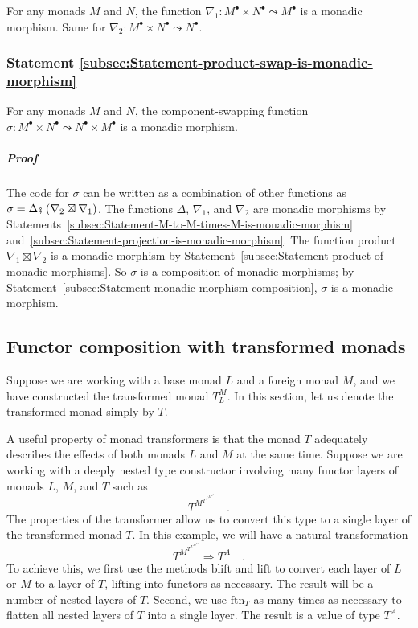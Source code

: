 For any monads $M$ and $N$, the function $\nabla_{1}:M^{\bullet}\times N^{\bullet}\leadsto M^{\bullet}$
is a monadic morphism. Same for $\nabla_{2}:M^{\bullet}\times N^{\bullet}\leadsto N^{\bullet}$.

\subsubsection{Statement \label{subsec:Statement-product-swap-is-monadic-morphism}\ref{subsec:Statement-product-swap-is-monadic-morphism}}

For any monads $M$ and $N$, the component-swapping function $\sigma:M^{\bullet}\times N^{\bullet}\leadsto N^{\bullet}\times M^{\bullet}$
is a monadic morphism.

\subparagraph{Proof}

The code for $\sigma$ can be written as a combination of other functions
as $\sigma=\Delta\bef\left(\nabla_{2}\boxtimes\nabla_{1}\right)$.
The functions $\Delta$, $\nabla_{1}$, and $\nabla_{2}$ are monadic
morphisms by Statements~\ref{subsec:Statement-M-to-M-times-M-is-monadic-morphism}
and~\ref{subsec:Statement-projection-is-monadic-morphism}. The function
product $\nabla_{1}\boxtimes\nabla_{2}$ is a monadic morphism by
Statement~\ref{subsec:Statement-product-of-monadic-morphisms}. So
$\sigma$ is a composition of monadic morphisms; by Statement~\ref{subsec:Statement-monadic-morphism-composition},
$\sigma$ is a monadic morphism.

\subsection{Functor composition with transformed monads}

Suppose we are working with a base monad $L$ and a foreign monad
$M$, and we have constructed the transformed monad $T_{L}^{M}$.
In this section, let us denote the transformed monad simply by $T$. 

A useful property of monad transformers is that the monad $T$ adequately
describes the effects of both monads $L$ and $M$ at the same time.
Suppose we are working with a deeply nested type constructor involving
many functor layers of monads $L$, $M$, and $T$ such as
\[
T^{M^{T^{L^{M^{L^{A}}}}}}\quad.
\]
The properties of the transformer allow us to convert this type to
a single layer of the transformed monad $T$. In this example, we
will have a natural transformation
\[
T^{M^{T^{L^{M^{L^{A}}}}}}\Rightarrow T^{A}\quad.
\]
To achieve this, we first use the methods $\text{blift}$ and $\text{lift}$
to convert each layer of $L$ or $M$ to a layer of $T$, lifting
into functors as necessary. The result will be a number of nested
layers of $T$. Second, we use $\text{ftn}_{T}$ as many times as
necessary to flatten all nested layers of $T$ into a single layer.
The result is a value of type $T^{A}$.

